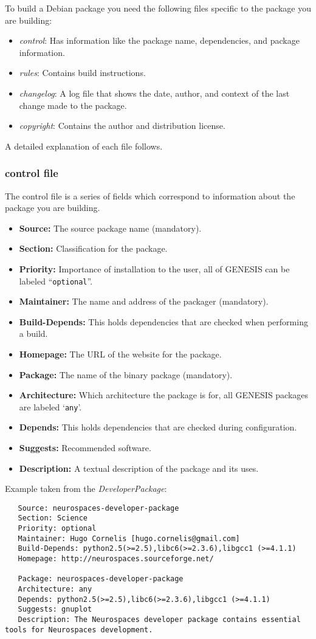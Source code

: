 \documentclass[12pt]{article}
\begin{document}
To build a Debian package you need the following files specific to the package you are building:
\begin{itemize}
\item {\it control}: Has information like the package name, dependencies, and package information.
\item {\it rules}: Contains build instructions.
\item {\it changelog}: A log file that shows the date, author, and context of the last change made to the package.
\item {\it copyright}: Contains the author and distribution license. 
\end{itemize}

A detailed explanation of each file follows.

\subsubsection*{control file}

The control file is a series of fields which correspond to information about the package you are building.
\begin{itemize}
\item {\bf Source:} The source package name ({\color{red}mandatory}).
\item {\bf Section:} Classification for the package.
\item {\bf Priority:} Importance of installation to the user, all of GENESIS can be labeled ``{\tt optional}''.
\item {\bf Maintainer:} The name and address of the packager ({\color{red}mandatory}).
\item {\bf Build-Depends:} This holds dependencies that are checked when performing a build.
\item {\bf Homepage:} The URL of the website for the package.
\item {\bf Package:} The name of the binary package ({\color{red}mandatory}).
\item {\bf Architecture:} Which architecture the package is for, all GENESIS packages are labeled `{\tt any}'.
\item {\bf Depends:} This holds dependencies that are checked during configuration.
\item {\bf Suggests:} Recommended software.
\item {\bf Description:} A textual description of the package and its uses. 
\end{itemize}
Example taken from the {\it DeveloperPackage}:
\begin{verbatim}
   Source: neurospaces-developer-package
   Section: Science 
   Priority: optional
   Maintainer: Hugo Cornelis [hugo.cornelis@gmail.com]
   Build-Depends: python2.5(>=2.5),libc6(>=2.3.6),libgcc1 (>=4.1.1)
   Homepage: http://neurospaces.sourceforge.net/
   
   Package: neurospaces-developer-package
   Architecture: any
   Depends: python2.5(>=2.5),libc6(>=2.3.6),libgcc1 (>=4.1.1)
   Suggests: gnuplot
   Description: The Neurospaces developer package contains essential tools for Neurospaces development.
\end{verbatim}
\end{document}
